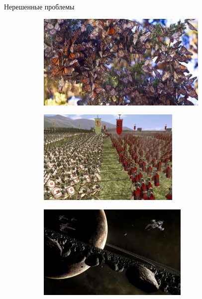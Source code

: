 \documentclass[aspectratio=169]{beamer}
\begin{document}
\begin{frame}{Нерешенные проблемы}

\begin{figure}
  \begin{subfigure}[b]{.3\linewidth}
    \centering
    \includegraphics[width=0.9\textwidth]{images/butterflies.jpg}
  \end{subfigure}
  \begin{subfigure}[b]{.3\linewidth}
    \centering
    \includegraphics[width=0.75\textwidth]{images/totalwar.jpg}
  \end{subfigure} \quad
  \begin{subfigure}[b]{.3\linewidth} 
    \includegraphics[width=0.8\textwidth]{images/saturn.jpg}
  \end{subfigure}%
\end{figure}

\end{frame}
\end{document}
